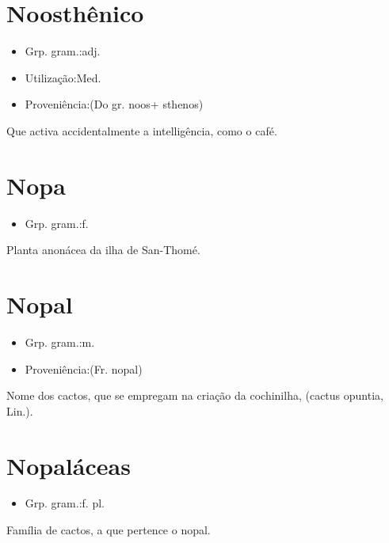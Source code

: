 \section{Noosthênico}
\begin{itemize}
\item {Grp. gram.:adj.}
\end{itemize}
\begin{itemize}
\item {Utilização:Med.}
\end{itemize}
\begin{itemize}
\item {Proveniência:(Do gr. \textunderscore noos\textunderscore  + \textunderscore sthenos\textunderscore )}
\end{itemize}
Que activa accidentalmente a intelligência, como o café.
\section{Nopa}
\begin{itemize}
\item {Grp. gram.:f.}
\end{itemize}
Planta anonácea da ilha de San-Thomé.
\section{Nopal}
\begin{itemize}
\item {Grp. gram.:m.}
\end{itemize}
\begin{itemize}
\item {Proveniência:(Fr. \textunderscore nopal\textunderscore )}
\end{itemize}
Nome dos cactos, que se empregam na criação da cochinilha, (\textunderscore cactus opuntia\textunderscore , Lin.).
\section{Nopaláceas}
\begin{itemize}
\item {Grp. gram.:f. pl.}
\end{itemize}
Família de cactos, a que pertence o nopal.

